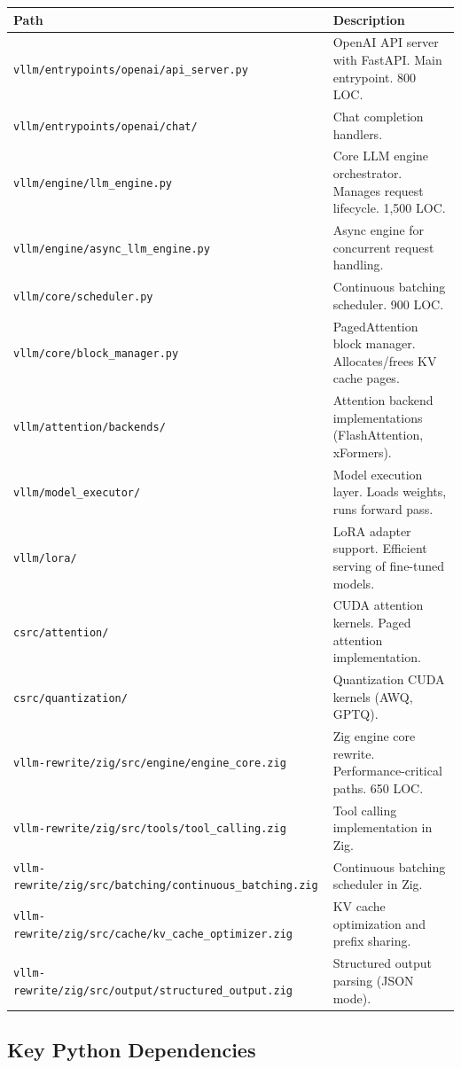 \documentclass[11pt,a4paper]{article}
\begin{document}
\begin{longtable}{@{}L{6cm}L{8cm}@{}}
\toprule
\textbf{Path} & \textbf{Description} \\
\midrule
\endhead
\texttt{vllm/entrypoints/openai/api\_server.py} & OpenAI API server with FastAPI. Main entrypoint. 800 LOC. \\
\texttt{vllm/entrypoints/openai/chat/} & Chat completion handlers. \\
\texttt{vllm/engine/llm\_engine.py} & Core LLM engine orchestrator. Manages request lifecycle. 1,500 LOC. \\
\texttt{vllm/engine/async\_llm\_engine.py} & Async engine for concurrent request handling. \\
\texttt{vllm/core/scheduler.py} & Continuous batching scheduler. 900 LOC. \\
\texttt{vllm/core/block\_manager.py} & PagedAttention block manager. Allocates/frees KV cache pages. \\
\texttt{vllm/attention/backends/} & Attention backend implementations (FlashAttention, xFormers). \\
\texttt{vllm/model\_executor/} & Model execution layer. Loads weights, runs forward pass. \\
\texttt{vllm/lora/} & LoRA adapter support. Efficient serving of fine-tuned models. \\
\texttt{csrc/attention/} & CUDA attention kernels. Paged attention implementation. \\
\texttt{csrc/quantization/} & Quantization CUDA kernels (AWQ, GPTQ). \\
\texttt{vllm-rewrite/zig/src/engine/engine\_core.zig} & Zig engine core rewrite. Performance-critical paths. 650 LOC. \\
\texttt{vllm-rewrite/zig/src/tools/tool\_calling.zig} & Tool calling implementation in Zig. \\
\texttt{vllm-rewrite/zig/src/batching/continuous\_batching.zig} & Continuous batching scheduler in Zig. \\
\texttt{vllm-rewrite/zig/src/cache/kv\_cache\_optimizer.zig} & KV cache optimization and prefix sharing. \\
\texttt{vllm-rewrite/zig/src/output/structured\_output.zig} & Structured output parsing (JSON mode). \\
\bottomrule
\end{longtable}

\subsection{Key Python Dependencies}
\end{document}
